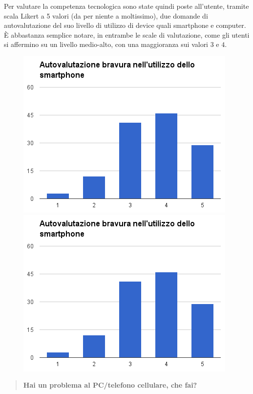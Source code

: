 Per valutare la competenza tecnologica sono state quindi poste all'utente,
tramite scala Likert a 5 valori (da per niente a moltissimo),
due domande di autovalutazione del suo livello di utilizzo di device
quali smartphone e computer.
\\
È abbastanza semplice notare, in entrambe le scale di valutazione,
come gli utenti si affermino su un livello
medio-alto, con una maggioranza sui valori $3$ e $4$.
\begin{figure}[H]
\centering
\begin{minipage}{.48\textwidth}
	\includegraphics[scale=0.45]{img/chart_bravura_smartphone}
\end{minipage}
\hfill
\begin{minipage}{.49\textwidth}
	\includegraphics[scale=0.45]{img/chart_bravura_smartphone}
\end{minipage}
\end{figure}

\begin{quote}
	\textbf{Hai un problema al PC/telefono cellulare, che fai?}
\end{quote}

